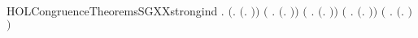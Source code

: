 \newcommand{\HOLCongruenceTheoremsSGXXSEQXXstrongXXinduction}{\UseVerbatim{HOLCongruenceTheoremsSGXXSEQXXstrongXXinduction}}
\begin{SaveVerbatim}{HOLCongruenceTheoremsSGXXstrongind}
\HOLTokenTurnstile{} \HOLSymConst{\HOLTokenForall{}}.
       \ensuremath{(}\HOLSymConst{\HOLTokenForall{}}.  \ensuremath{(}\HOLTokenLambda{}. \ensuremath{)}\ensuremath{)} \HOLSymConst{\HOLTokenConj{}}
       \ensuremath{(}\HOLSymConst{\HOLTokenForall{}} .   \HOLSymConst{\HOLTokenImp{}}  \ensuremath{(}\HOLTokenLambda{}.  \HOLSymConst{\ensuremath{\ldotp}} \ensuremath{)}\ensuremath{)} \HOLSymConst{\HOLTokenConj{}}
       \ensuremath{(}\HOLSymConst{\HOLTokenForall{}} .   \HOLSymConst{\HOLTokenConj{}}   \HOLSymConst{\HOLTokenImp{}}  \ensuremath{(}\HOLTokenLambda{}. \HOLSymConst{\ensuremath{\ldotp}} \ensuremath{)}\ensuremath{)} \HOLSymConst{\HOLTokenConj{}}
       \ensuremath{(}\HOLSymConst{\HOLTokenForall{}} .
              \HOLSymConst{\HOLTokenConj{}}   \HOLSymConst{\HOLTokenConj{}}   \HOLSymConst{\HOLTokenConj{}}   \HOLSymConst{\HOLTokenImp{}}
             \ensuremath{(}\HOLTokenLambda{}.   \HOLSymConst{\ensuremath{+}}  \ensuremath{)}\ensuremath{)} \HOLSymConst{\HOLTokenConj{}}
       \ensuremath{(}\HOLSymConst{\HOLTokenForall{}} .
              \HOLSymConst{\HOLTokenConj{}}   \HOLSymConst{\HOLTokenConj{}}   \HOLSymConst{\HOLTokenConj{}}   \HOLSymConst{\HOLTokenImp{}}
             \ensuremath{(}\HOLTokenLambda{}.   \HOLSymConst{\ensuremath{\mid}}  \ensuremath{)}\ensuremath{)} \HOLSymConst{\HOLTokenConj{}}

\end{SaveVerbatim}
